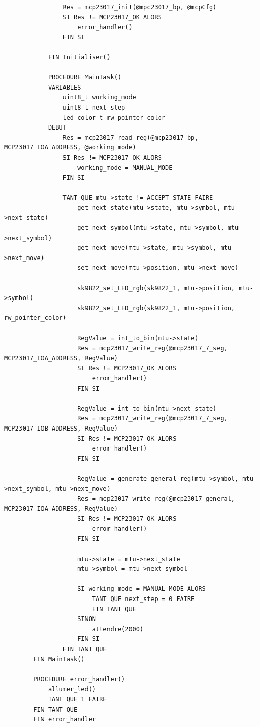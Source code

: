 \documentclass[12pt]{report}
\begin{document}
\begin{lstlisting}
				Res = mcp23017_init(@mpc23017_bp, @mcpCfg)
				SI Res != MCP23017_OK ALORS
					error_handler()
				FIN SI
		
			FIN Initialiser()
		
			PROCEDURE MainTask()
			VARIABLES
				uint8_t working_mode
				uint8_t next_step
				led_color_t rw_pointer_color
			DEBUT
				Res = mcp23017_read_reg(@mcp23017_bp, MCP23017_IOA_ADDRESS, @working_mode)
				SI Res != MCP23017_OK ALORS
					working_mode = MANUAL_MODE
				FIN SI
		
				TANT QUE mtu->state != ACCEPT_STATE FAIRE
					get_next_state(mtu->state, mtu->symbol, mtu->next_state)
					get_next_symbol(mtu->state, mtu->symbol, mtu->next_symbol)
					get_next_move(mtu->state, mtu->symbol, mtu->next_move)
					set_next_move(mtu->position, mtu->next_move)
		
					sk9822_set_LED_rgb(sk9822_1, mtu->position, mtu->symbol)
					sk9822_set_LED_rgb(sk9822_1, mtu->position, rw_pointer_color)
		
					RegValue = int_to_bin(mtu->state)
					Res = mcp23017_write_reg(@mcp23017_7_seg, MCP23017_IOA_ADDRESS, RegValue)
					SI Res != MCP23017_OK ALORS
						error_handler()
					FIN SI
		
					RegValue = int_to_bin(mtu->next_state)
					Res = mcp23017_write_reg(@mcp23017_7_seg, MCP23017_IOB_ADDRESS, RegValue)
					SI Res != MCP23017_OK ALORS
						error_handler()
					FIN SI
		
					RegValue = generate_general_reg(mtu->symbol, mtu->next_symbol, mtu->next_move)
					Res = mcp23017_write_reg(@mcp23017_general, MCP23017_IOA_ADDRESS, RegValue)
					SI Res != MCP23017_OK ALORS
						error_handler()
					FIN SI
		
					mtu->state = mtu->next_state
					mtu->symbol = mtu->next_symbol
		
					SI working_mode = MANUAL_MODE ALORS
						TANT QUE next_step = 0 FAIRE
						FIN TANT QUE
					SINON
						attendre(2000)
					FIN SI
				FIN TANT QUE
		FIN MainTask()
		
		PROCEDURE error_handler()
			allumer_led()
			TANT QUE 1 FAIRE
		FIN TANT QUE
		FIN error_handler
	\end{lstlisting}
\end{document}

